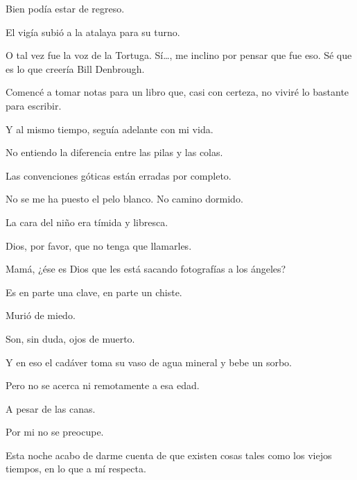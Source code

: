 \sk
Bien podía estar de regreso. 

\sk
El vigía subió a la atalaya para su turno. 

\sk
O tal vez fue la voz de la Tortuga. Sí\ldots{}, me
inclino por pensar que fue eso. Sé que es lo que
creería Bill Denbrough.

\sk
Comencé a tomar notas
para un libro que, casi con certeza, no viviré lo
bastante para escribir.\nb{}

\sk
Y al mismo tiempo, seguía
adelante con mi vida. 

\sk
No entiendo la diferencia entre las pilas y las colas. 

\sk
Las convenciones góticas están erradas por
completo. 

\sk
No se me ha puesto el pelo blanco. No
camino dormido. 

\sk
La cara del niño era tímida y libresca. 

\sk
Dios, por favor, que no tenga que llamarles.

\sk
Mamá, ¿ése es Dios que les
está sacando fotografías a los ángeles? 

\sk
Es en parte una clave, en parte un chiste. 

\sk
Murió de miedo. \nb{}

\sk
Son, sin duda, ojos de muerto. 

\sk
Y en eso el cadáver toma
su vaso de agua mineral y bebe un sorbo.

\sk
Pero no se acerca ni remotamente a esa edad. 

\sk
A pesar de las canas. 

\sk
Por mi no se preocupe. 

\sk
Esta noche acabo de darme cuenta de
que existen cosas tales como los viejos tiempos,
en lo que a mí respecta.

